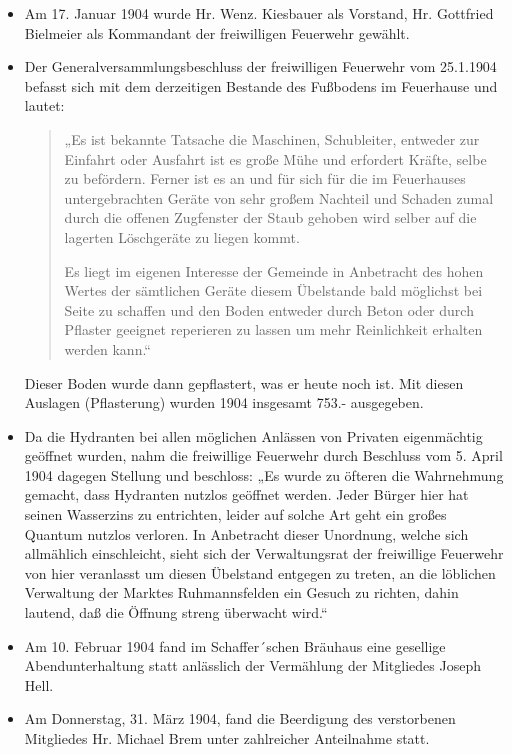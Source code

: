 \documentclass[12pt,a4paper]{book}
\begin{document}
\begin{itemize}
\item Am 17. Januar 1904 wurde Hr. Wenz. Kiesbauer als Vorstand, Hr. Gottfried
Bielmeier als Kommandant der freiwilligen Feuerwehr gewählt.

\item Der Generalversammlungsbeschluss der freiwilligen Feuerwehr vom 25.1.1904
befasst sich mit dem derzeitigen Bestande des Fußbodens im Feuerhause und
lautet:

\begin{quote}
„Es ist bekannte Tatsache die Maschinen, Schubleiter, entweder zur
Einfahrt oder Ausfahrt ist es große Mühe und erfordert Kräfte, selbe zu
befördern. Ferner ist es an und für sich für die im Feuerhauses untergebrachten
Geräte von sehr großem Nachteil und Schaden zumal durch die offenen Zugfenster
der Staub gehoben wird selber auf die lagerten Löschgeräte zu liegen kommt.

Es liegt im eigenen Interesse der Gemeinde in Anbetracht des hohen Wertes der
sämtlichen Geräte diesem Übelstande bald möglichst bei Seite zu schaffen und den
Boden entweder durch Beton oder durch Pflaster geeignet reperieren zu lassen um
mehr Reinlichkeit erhalten werden kann.“
\end{quote}

Dieser Boden wurde dann gepflastert, was er heute noch ist. Mit diesen Auslagen
(Pflasterung) wurden 1904 insgesamt 753.- ausgegeben.

\item Da die Hydranten bei allen möglichen Anlässen von Privaten eigenmächtig
geöffnet wurden, nahm die freiwillige Feuerwehr durch Beschluss vom 5. April
1904 dagegen Stellung und beschloss: „Es wurde zu öfteren die Wahrnehmung
gemacht, dass Hydranten nutzlos geöffnet werden. Jeder Bürger hier hat seinen
Wasserzins zu entrichten, leider auf solche Art geht ein großes Quantum nutzlos
verloren. In Anbetracht dieser Unordnung, welche sich allmählich einschleicht,
sieht sich der Verwaltungsrat der freiwillige Feuerwehr von hier veranlasst um
diesen Übelstand entgegen zu treten, an die löblichen Verwaltung der Marktes
Ruhmannsfelden ein Gesuch zu richten, dahin lautend, daß die Öffnung streng
überwacht wird.“

\item Am 10. Februar 1904 fand im Schaffer´schen Bräuhaus eine gesellige
Abendunterhaltung statt anlässlich der Vermählung der Mitgliedes Joseph Hell.

\item Am Donnerstag, 31. März 1904, fand die Beerdigung des verstorbenen
Mitgliedes Hr. Michael Brem unter zahlreicher Anteilnahme statt.


\end{itemize}
\end{document}
